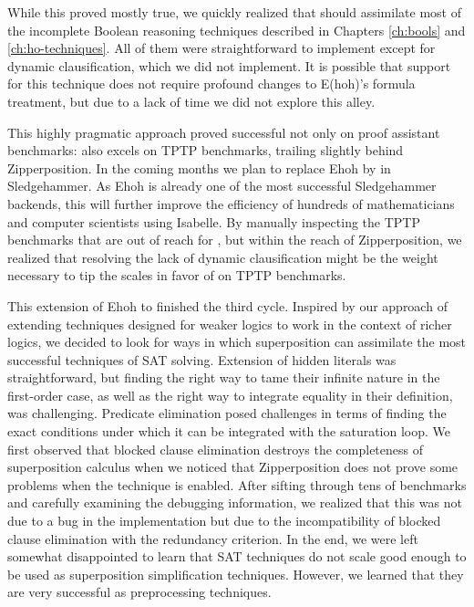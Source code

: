 While this proved mostly true, we quickly realized that \ehohii{} should
assimilate most of the incomplete Boolean reasoning techniques described in Chapters
\ref{ch:bools} and \ref{ch:ho-techniques}. All of them were straightforward to
implement except for dynamic clausification, which we did not implement. It is
possible that support for this technique does not require profound changes to
E(hoh)'s formula treatment, but due to a lack of time we did not explore this
alley.

This highly pragmatic approach proved successful not only on proof assistant
benchmarks: \ehohii{} also excels on TPTP benchmarks, trailing slightly behind
Zipperposition. In the coming months we plan to replace Ehoh by \ehohii{} in Sledgehammer.
As Ehoh is already one of the most successful Sledgehammer backends,
this will further improve the efficiency of hundreds of mathematicians and computer scientists using Isabelle.
By manually inspecting the TPTP benchmarks that are out of reach
for \ehohii{}, but within the reach of Zipperposition, we realized that resolving the lack of
dynamic clausification might be the weight necessary to tip the scales in
favor of \ehohii{} on TPTP benchmarks. 

This extension of Ehoh to \ehohii{} finished the third cycle. Inspired by our
approach of extending techniques designed for weaker logics to work in the
context of richer logics, we decided to look for ways in which superposition can
assimilate the most successful techniques of SAT solving. Extension of hidden
literals was straightforward, but finding the right way to tame their infinite
nature in the first-order case, as well as the right way to integrate equality
in their definition, was challenging. Predicate elimination posed challenges in
terms of finding the exact conditions under which it can be integrated with the
saturation loop. We first observed that blocked clause elimination destroys the
completeness of superposition calculus when we noticed that Zipperposition does
not prove some problems when the technique is enabled. After sifting through tens of
benchmarks and carefully examining the debugging information, we realized that
this was not due to a bug in the implementation but due to the incompatibility of
blocked clause elimination with the redundancy criterion. In the end, we were left
somewhat disappointed to learn that SAT techniques do not scale good enough to be used
as superposition simplification techniques. However, we learned that they are
very successful as preprocessing techniques.

